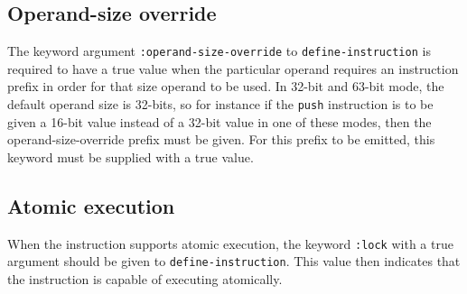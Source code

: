 \subsection{Operand-size override}

The keyword argument \texttt{:operand-size-override} to
\texttt{define-instruction} is required to have a true value when the
particular operand requires an instruction prefix in order for that
size operand to be used.  In 32-bit and 63-bit mode, the default
operand size is 32-bits, so for instance if the \texttt{push}
instruction is to be given a 16-bit value instead of a 32-bit value in
one of these modes, then the operand-size-override prefix must be
given.  For this prefix to be emitted, this keyword must be supplied
with a true value.

\subsection{Atomic execution}

When the instruction supports atomic execution, the keyword
\texttt{:lock} with a true argument should be given to
\texttt{define-instruction}.  This value then indicates that the
instruction is capable of executing atomically.
